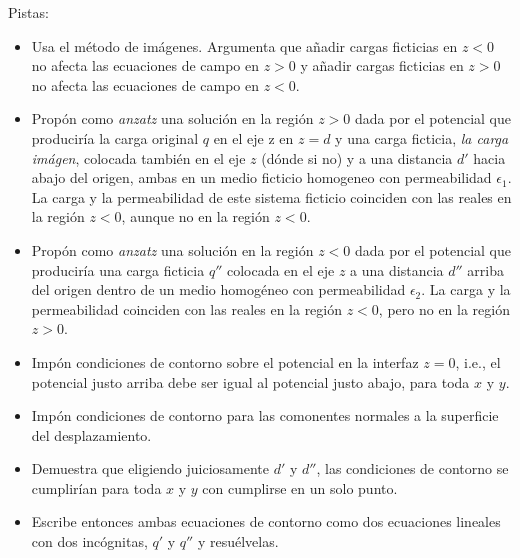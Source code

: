 \documentclass{exam}
\begin{document}
\begin{questions}
  Pistas:
  \begin{itemize}
  \item Usa el método de imágenes. Argumenta que añadir cargas
    ficticias en $z<0$ no afecta las ecuaciones de campo en $z>0$ y
    añadir cargas ficticias en $z>0$ no afecta las ecuaciones de campo
    en $z<0$.
  \item Propón como {\em anzatz} una solución en la región $z>0$ dada
    por el potencial que produciría la carga original $q$ en el eje z
    en $z=d$ y una carga ficticia, {\em la carga imágen}, colocada
    también en el eje $z$ (dónde si no) y a una distancia $d'$ hacia
    abajo del origen, ambas en un medio ficticio homogeneo con
    permeabilidad $\epsilon_1$. La carga y la permeabilidad de este
    sistema ficticio coinciden con las reales en la región $z<0$,
    aunque no en la región $z<0$.
  \item Propón como {\em anzatz} una solución en la región $z<0$ dada
    por el potencial que produciría una carga ficticia $q''$ colocada
    en el eje $z$ a una distancia $d''$ arriba del origen dentro de un
    medio homogéneo con permeabilidad $\epsilon_2$. La carga y la
    permeabilidad coinciden con las reales en la región $z<0$, pero no
    en la región $z>0$.
  \item Impón condiciones de contorno sobre el potencial en la
    interfaz $z=0$, i.e., el potencial justo arriba debe ser igual al
    potencial justo abajo, para toda $x$ y $y$.
  \item Impón condiciones de contorno para las comonentes normales a
    la superficie del desplazamiento.
  \item Demuestra que eligiendo juiciosamente $d'$ y $d''$, las
    condiciones de contorno se cumplirían para toda $x$ y $y$ con
    cumplirse en un solo punto.
  \item Escribe entonces ambas ecuaciones de contorno como dos
    ecuaciones lineales con dos incógnitas, $q'$ y $q''$ y
    resuélvelas.
  \end{itemize}
\end{questions}
\end{document}
